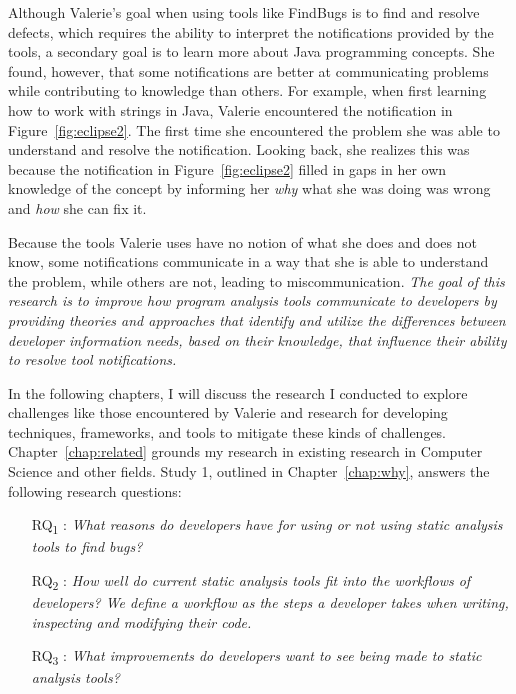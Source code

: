 Although Valerie's goal when using tools like FindBugs is to find and resolve defects, which requires the ability to interpret the notifications provided by the tools, a secondary goal is to learn more about Java programming concepts. She found, however, that some notifications are better at communicating problems while contributing to knowledge than others. For example, when first learning how to work with strings in Java, Valerie encountered the notification in Figure~\ref{fig:eclipse2}. The first time she encountered the problem she was able to understand and resolve the notification. Looking back, she realizes this was because the notification in Figure~\ref{fig:eclipse2} filled in gaps in her own knowledge of the concept by informing her \emph{why} what she was doing was wrong and \emph{how} she can fix it.

Because the tools Valerie uses have no notion of what she does and does not know, some notifications communicate in a way that she is able to understand the problem, while others are not, leading to  miscommunication.
\textit{The goal of this research is to improve how program analysis tools communicate to developers by providing theories and approaches that identify and utilize the differences between developer information needs, based on their knowledge, that influence their ability to resolve tool notifications.}

In the following chapters, I will discuss the research I conducted to explore challenges like those encountered by Valerie and research for developing techniques, frameworks, and tools to mitigate these kinds of challenges.
Chapter~\ref{chap:related} grounds my research in existing research in Computer Science and other fields.
Study 1, outlined in Chapter~\ref{chap:why}, answers the following research questions:
\begin{itemize}
    \item [RQ\textsubscript{1}]: \textit{What reasons do developers have for using or not using static analysis tools to find bugs?}
    \item [RQ\textsubscript{2}]: \textit{How well do current static analysis tools fit into the workflows of developers? We define a workflow as the steps a developer takes when writing, inspecting and modifying their code.}
    \item [RQ\textsubscript{3}]: \textit{What improvements do developers want to see being made to static analysis tools?}
\end{itemize}

